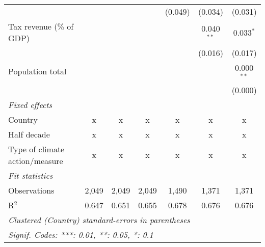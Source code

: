 \begin{tabular}{lcccccc}
                                                     &              &                &                & (0.049)        & (0.034)        & (0.031)\\   
   Tax revenue (\% of GDP)                           &              &                &                &                & 0.040$^{**}$   & 0.033$^{*}$\\   
                                                     &              &                &                &                & (0.016)        & (0.017)\\   
   Population total                                  &              &                &                &                &                & 0.000$^{**}$\\   
                                                     &              &                &                &                &                & (0.000)\\   
   \emph{Fixed effects}\\
   Country                                           & x            & x              & x              & x              & x              & x\\  
   Half decade                                       & x            & x              & x              & x              & x              & x\\  
   Type of climate action/measure                    & x            & x              & x              & x              & x              & x\\  
   \midrule \emph{Fit statistics}\\
   Observations                                      & 2,049        & 2,049          & 2,049          & 1,490          & 1,371          & 1,371\\  
   R$^2$                                             & 0.647        & 0.651          & 0.655          & 0.678          & 0.676          & 0.676\\  
   \midrule
   \multicolumn{7}{l}{\emph{Clustered (Country) standard-errors in parentheses}}\\
   \multicolumn{7}{l}{\emph{Signif. Codes: ***: 0.01, **: 0.05, *: 0.1}}\\
\end{tabular}
\par\endgroup


